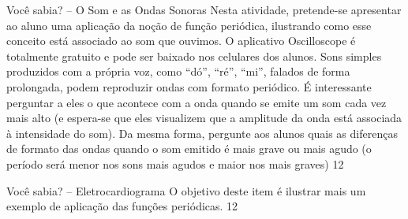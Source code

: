 \begin{sugestions}{Você sabia? -- O Som e as Ondas Sonoras}
{Nesta atividade, pretende-se apresentar ao aluno uma aplicação da noção de função periódica, ilustrando como esse conceito está associado ao som que ouvimos. O aplicativo Oscilloscope é totalmente gratuito e pode ser baixado nos celulares dos alunos. Sons simples produzidos com a própria voz, como “dó”, “ré”, “mi”, falados de forma prolongada, podem reproduzir ondas com formato periódico. É interessante perguntar a eles o que acontece com a onda quando se emite um som cada vez mais alto (e espera-se que eles visualizem que a amplitude da onda está associada à intensidade do som). Da mesma forma, pergunte aos alunos quais as diferenças de formato das ondas quando o som emitido é mais grave ou mais agudo (o período será menor nos sons mais agudos e maior nos mais graves)}
{1}{2}
\end{sugestions}
\clearmargin
\clearmargin
\begin{objectives}{Você sabia? -- Eletrocardiograma}
{
O objetivo deste item é ilustrar mais um exemplo de aplicação das funções periódicas.
}{1}{2}
\end{objectives}
